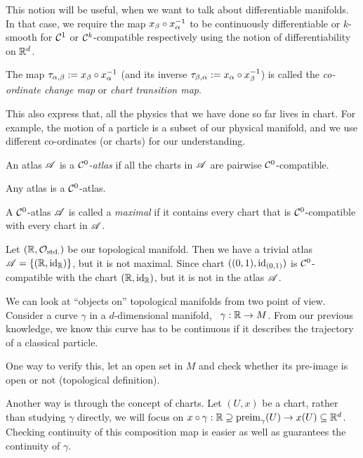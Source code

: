 This notion will be useful, when we want to talk about differentiable manifolds. In that case, we require the map \(x_{\beta} \circ x_{\alpha}^{-1}\) to be continuously differentiable or \(k\)-smooth for \(\mathcal C^1\) or \(\mathcal C^k\)-compatible respectively using the notion of differentiability on \(\mathbb R^d\).

\begin{remark}
	The map \(\tau_{\alpha, \beta} := x_{\beta} \circ x_{\alpha}^{-1}\) (and its inverse \(\tau_{\beta, \alpha} := x_{\alpha} \circ x_{\beta}^{-1}\)) is called the \emph{co-ordinate change map} or \emph{chart transition map}.
\end{remark}
This also express that, all the physics that we have done so far lives in chart. For example, the motion of a particle is a subset of our physical manifold, and we use different co-ordinates (or charts) for our understanding.

\begin{definition}[\(\SC^0\)-Atlas]\label{def:c0-atlas}
	An atlas \(\mathscr{A}\) is a \emph{\(\SC^0\)-atlas} if all the charts in \(\mathscr{A}\) are pairwise \(\SC^0\)-compatible.
\end{definition}

\noindent Any atlas is a \(\SC^0\)-atlas.

\begin{definition}
	A \(\SC^0\)-atlas \(\mathscr{A}\) is called a \emph{maximal} if it contains every chart that is \(\SC^0\)-compatible with every chart in \(\mathscr{A}\).
\end{definition}

\begin{example}
	Let \((\mathbb R, \mathcal{O}_{\text{std.}})\) be our topological manifold. Then we have a trivial atlas \(\mathscr{A} = \qty{(\mathbb R, \operatorname{id}_{\mathbb R})}\), but it is not maximal. Since chart \(((0, 1), \operatorname{id}_{(0, 1)})\) is \(\SC^0\)-compatible with the chart \((\mathbb R, \operatorname{id}_{\mathbb R})\), but it is not in the atlas \(\mathscr{A}\).
\end{example}

We can look at ``objects on'' topological manifolds from two point of view. Consider a curve \(\gamma\) in a \(d\)-dimensional manifold, \ie\ \(\gamma: \mathbb R \to M\). From our previous knowledge, we know this curve has to be continuous if it describes the trajectory of a classical particle.

One way to verify this, let an open set in \(M\) and check whether its pre-image is open or not (topological definition).

Another way is through the concept of charts. Let \((U, x)\) be a chart, rather than studying \(\gamma\) directly, we will focus on \(x \circ \gamma: \mathbb R \supseteq \operatorname{preim}_{\gamma}(U) \to x(U) \subseteq \mathbb R^d\). Checking continuity of this composition map is easier as well as guarantees the continuity of \(\gamma\).

